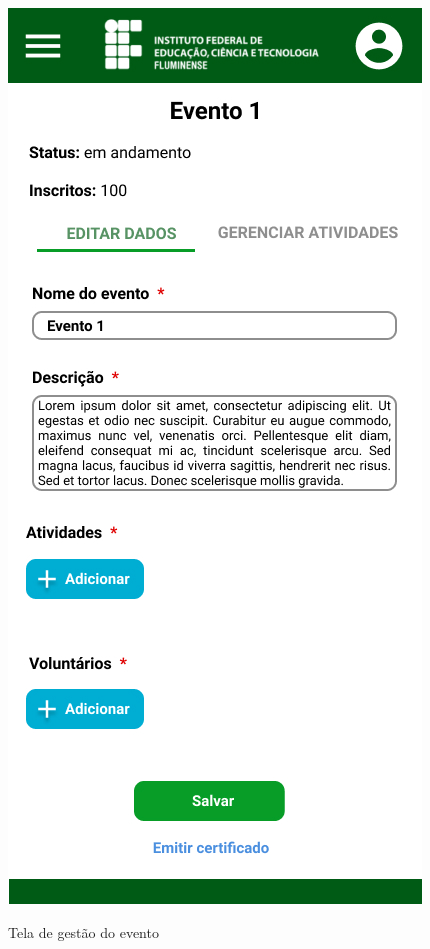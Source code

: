 \begin{figure}[H]
    \centering
    \caption{Tela de gestão do evento}
    \includegraphics[scale=0.44]{figuras/Gestao/8-EditarEvento.jpg}
    \label{fig:gestao8}
\end{figure}

